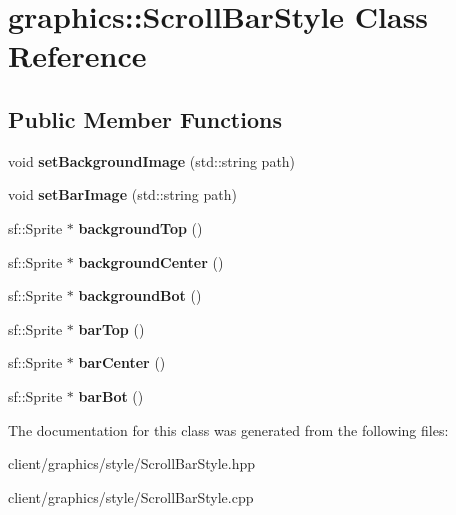 \hypertarget{classgraphics_1_1_scroll_bar_style}{\section{graphics\-:\-:Scroll\-Bar\-Style Class Reference}
\label{classgraphics_1_1_scroll_bar_style}
}
\subsection*{Public Member Functions}
\begin{DoxyCompactItemize}
\item 
\hypertarget{classgraphics_1_1_scroll_bar_style_a3a44e9b95329935469d3963310f14cb8}{void {\bfseries set\-Background\-Image} (std\-::string path)}\label{classgraphics_1_1_scroll_bar_style_a3a44e9b95329935469d3963310f14cb8}

\item 
\hypertarget{classgraphics_1_1_scroll_bar_style_a65067fb83dae79dd2b1c37c6b480ca7b}{void {\bfseries set\-Bar\-Image} (std\-::string path)}\label{classgraphics_1_1_scroll_bar_style_a65067fb83dae79dd2b1c37c6b480ca7b}

\item 
\hypertarget{classgraphics_1_1_scroll_bar_style_a6c64c7d58de95237e1a9bd6dc2309cb0}{sf\-::\-Sprite $\ast$ {\bfseries background\-Top} ()}\label{classgraphics_1_1_scroll_bar_style_a6c64c7d58de95237e1a9bd6dc2309cb0}

\item 
\hypertarget{classgraphics_1_1_scroll_bar_style_a54952f9de80de8086ddf2dcce253c721}{sf\-::\-Sprite $\ast$ {\bfseries background\-Center} ()}\label{classgraphics_1_1_scroll_bar_style_a54952f9de80de8086ddf2dcce253c721}

\item 
\hypertarget{classgraphics_1_1_scroll_bar_style_a7c73bb8a9ed1269061eb57358116eafd}{sf\-::\-Sprite $\ast$ {\bfseries background\-Bot} ()}\label{classgraphics_1_1_scroll_bar_style_a7c73bb8a9ed1269061eb57358116eafd}

\item 
\hypertarget{classgraphics_1_1_scroll_bar_style_a270c5e4238dca8d05d39ce66f3437ecd}{sf\-::\-Sprite $\ast$ {\bfseries bar\-Top} ()}\label{classgraphics_1_1_scroll_bar_style_a270c5e4238dca8d05d39ce66f3437ecd}

\item 
\hypertarget{classgraphics_1_1_scroll_bar_style_a8447d50f3ca90c9f1a9cbb99e1a31bca}{sf\-::\-Sprite $\ast$ {\bfseries bar\-Center} ()}\label{classgraphics_1_1_scroll_bar_style_a8447d50f3ca90c9f1a9cbb99e1a31bca}

\item 
\hypertarget{classgraphics_1_1_scroll_bar_style_a99cab922562532a1d0ec54ba05fb1c2a}{sf\-::\-Sprite $\ast$ {\bfseries bar\-Bot} ()}\label{classgraphics_1_1_scroll_bar_style_a99cab922562532a1d0ec54ba05fb1c2a}

\end{DoxyCompactItemize}


The documentation for this class was generated from the following files\-:\begin{DoxyCompactItemize}
\item 
client/graphics/style/Scroll\-Bar\-Style.\-hpp\item 
client/graphics/style/Scroll\-Bar\-Style.\-cpp\end{DoxyCompactItemize}
